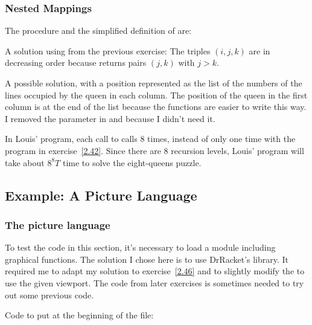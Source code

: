 \subsubsection{Nested Mappings}

\begin{exe}[2.40]
    The procedure  and the simplified definition of 
     are:
\end{exe}

\begin{exe}[2.41]
    A solution using  from the previous exercise:
    The triples $(i, j, k)$ are in decreasing order because  
    returns pairs $(j, k)$ with $j > k$.
\end{exe}

\begin{exe}[2.42]
    \label{2.42}
    A possible solution, with a position represented as the list of the numbers 
    of the lines occupied by the queen in each column. The position of the queen 
    in the first column is at the end of the list because the functions are 
    easier to write this way. I removed the  parameter in  
    and  because I didn’t need it.
\end{exe}

\begin{exe}[2.43]
    In Louis’ program, each call to  calls 
     8 times, instead of only one time with the 
    program in exercise~\ref{2.42}. Since there are 8 recursion levels, Louis’ 
    program will take about $8^8T$ time to solve the eight-queens puzzle.
\end{exe}

\subsection{Example: A Picture Language}
\label{2.2.4}

\subsubsection{The picture language}

\begin{comp}
    To test the code in this section, it’s necessary to load a module including 
    graphical functions. The solution I chose here is to use DrRacket’s 
     library. It required me to adapt my solution to 
    exercise~\ref{2.46} and to slightly modify the  to 
    use the given viewport. The code from later exercises is sometimes needed to 
    try out some previous code.

    Code to put at the beginning of the file:
\end{comp}

